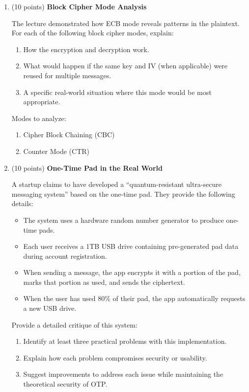 \documentclass[10pt,a4paper,american]{exam}
\begin{document}
\begin{enumerate}
	\item (10 points) \textbf{Block Cipher Mode Analysis}

	      The lecture demonstrated how ECB mode reveals patterns in the plaintext. For each of the following block cipher modes, explain:
	      \begin{enumerate}
		      \item How the encryption and decryption work.
		      \item What would happen if the same key and IV (when applicable) were reused for multiple messages.
		      \item A specific real-world situation where this mode would be most appropriate.
	      \end{enumerate}

	      Modes to analyze:
	      \begin{enumerate}
		      \item Cipher Block Chaining (CBC)
		      \item Counter Mode (CTR)
	      \end{enumerate}

	\item (10 points) \textbf{One-Time Pad in the Real World}

	      A startup claims to have developed a ``quantum-resistant ultra-secure messaging system'' based on the one-time pad. They provide the following details:

	      \begin{itemize}
		      \item The system uses a hardware random number generator to produce one-time pads.
		      \item Each user receives a 1TB USB drive containing pre-generated pad data during account registration.
		      \item When sending a message, the app encrypts it with a portion of the pad, marks that portion as used, and sends the ciphertext.
		      \item When the user has used 80\% of their pad, the app automatically requests a new USB drive.
	      \end{itemize}

	      Provide a detailed critique of this system:
	      \begin{enumerate}
		      \item Identify at least three practical problems with this implementation.
		      \item Explain how each problem compromises security or usability.
		      \item Suggest improvements to address each issue while maintaining the theoretical security of OTP.
	      \end{enumerate}


\end{enumerate}
\end{document}
